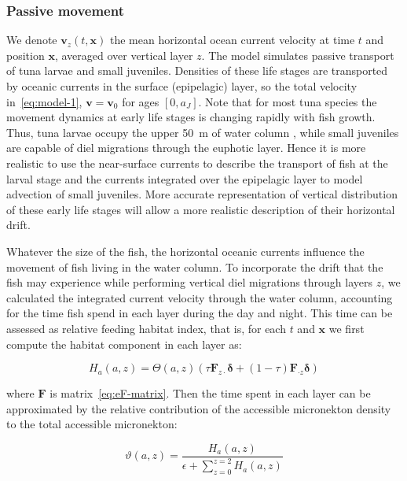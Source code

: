 \subsubsection{Passive movement}\label{sec:oceanic-currents}
We denote $\mathbf{v}_z(t,\mathbf{x})$ the mean horizontal ocean current velocity at time $t$ and position $\mathbf{x}$, averaged over vertical layer $z$. The model simulates passive transport of tuna larvae and small juveniles. Densities of these life stages are transported by oceanic currents in the surface (epipelagic) layer, so the total velocity in~\ref{eq:model-1}, $\mathbf{v}=\mathbf{v}_0$ for ages $[0,a_J]$. Note that for most tuna species the movement dynamics at early life stages is changing rapidly with fish growth. Thus, tuna larvae occupy the upper 50~m of water column \citep{Llopiz}, while small juveniles are capable of diel migrations through the euphotic layer. Hence it is more realistic to use the near-surface currents  to describe the transport of fish at the larval stage and the currents integrated over the epipelagic layer to model advection of small juveniles. More accurate representation of vertical distribution of these early life stages will allow a more realistic description of their horizontal drift.

Whatever the size of the fish, the horizontal oceanic currents influence the movement of fish living in the water column. To incorporate the drift that the fish may experience while performing vertical diel migrations through layers $z$, we calculated the integrated current velocity through the water column, accounting for the time fish spend in each layer during the day and night. This time can be assessed as relative feeding habitat index, that is, for each $t$ and $\mathbf{x}$ we first compute the habitat component in each layer as:

\begin{equation}
 H_a(a,z) = \Theta(a,z) \left( \tau \mathbf{F}_{z \cdot} \mathbf{\delta} +(1-\tau) \mathbf{F}_{\cdot z}\mathbf{\delta}\right)
\end{equation}

\noindent where $\mathbf{F}$ is matrix~\eqref{eq:eF-matrix}. Then the time spent in each layer can be approximated by the relative contribution of the accessible micronekton density to the total accessible micronekton: 

\begin{equation}
 \label{eq:relative-habitat}
 \vartheta(a,z)=\dfrac{H_a(a,z)}{\epsilon+\displaystyle\sum_{z=0}^{z=2} H_a(a,z)}
\end{equation}
  
